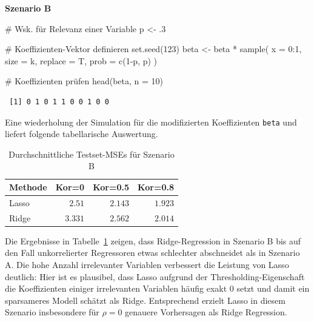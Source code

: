 \documentclass[
  a4paper,
  DIV=11,
  oneside]{scrreprt}
\newenvironment{Shaded}{\begin{snugshade}}{\end{snugshade}}
\newcommand{\AttributeTok}[1]{\textcolor[rgb]{0.40,0.45,0.13}{#1}}
\newcommand{\CommentTok}[1]{\textcolor[rgb]{0.37,0.37,0.37}{#1}}
\newcommand{\DecValTok}[1]{\textcolor[rgb]{0.68,0.00,0.00}{#1}}
\newcommand{\FunctionTok}[1]{\textcolor[rgb]{0.28,0.35,0.67}{#1}}
\newcommand{\NormalTok}[1]{\textcolor[rgb]{0.00,0.23,0.31}{#1}}
\newcommand{\OtherTok}[1]{\textcolor[rgb]{0.00,0.23,0.31}{#1}}
\newcommand{\SpecialCharTok}[1]{\textcolor[rgb]{0.37,0.37,0.37}{#1}}
\begin{document}
\textbf{Szenario B}

\begin{Shaded}
\begin{Highlighting}[]
\CommentTok{\# Wsk. für Relevanz einer Variable}
\NormalTok{p }\OtherTok{\textless{}{-}}\NormalTok{ .}\DecValTok{3}

\CommentTok{\# Koeffizienten{-}Vektor definieren}
\FunctionTok{set.seed}\NormalTok{(}\DecValTok{123}\NormalTok{)}
\NormalTok{beta }\OtherTok{\textless{}{-}}\NormalTok{ beta }\SpecialCharTok{*} \FunctionTok{sample}\NormalTok{(}
  \AttributeTok{x =} \DecValTok{0}\SpecialCharTok{:}\DecValTok{1}\NormalTok{, }
  \AttributeTok{size =}\NormalTok{ k, }
  \AttributeTok{replace =}\NormalTok{ T, }
  \AttributeTok{prob =} \FunctionTok{c}\NormalTok{(}\DecValTok{1}\SpecialCharTok{{-}}\NormalTok{p, p)}
\NormalTok{)}

\CommentTok{\# Koeffizienten prüfen}
\FunctionTok{head}\NormalTok{(beta, }\AttributeTok{n =} \DecValTok{10}\NormalTok{)}
\end{Highlighting}
\end{Shaded}

\begin{verbatim}
 [1] 0 1 0 1 1 0 0 1 0 0
\end{verbatim}

Eine wiederholung der Simulation für die modifizierten Koeffizienten
\texttt{beta} und liefert folgende tabellarische Auswertung.

\begin{longtable}{lrrr}

\caption{\label{tbl-lrsimB}Durchschnittliche Testset-MSEs für Szenario
B}

\tabularnewline

\toprule
Methode & Kor=0 & Kor=0.5 & Kor=0.8 \\ 
\midrule\addlinespace[2.5pt]
Lasso & $2.51$ & $2.143$ & $1.923$ \\ 
Ridge & $3.331$ & $2.562$ & $2.014$ \\ 
\bottomrule

\end{longtable}

Die Ergebnisse in Tabelle~\ref{tbl-lrsimB} zeigen, dass Ridge-Regression
in Szenario B bis auf den Fall unkorrelierter Regressoren etwas
schlechter abschneidet als in Szenario A. Die hohe Anzahl irrelevanter
Variablen verbessert die Leistung von Lasso deutlich: Hier ist es
plausibel, dass Lasso aufgrund der Thresholding-Eigenschaft die
Koeffizienten einiger irrelevanten Variablen häufig exakt \(0\) setzt
und damit ein sparsameres Modell schätzt als Ridge. Entsprechend erzielt
Lasso in diesem Szenario insbesondere für \(\rho = 0\) genauere
Vorhersagen als Ridge Regression.
\end{document}
